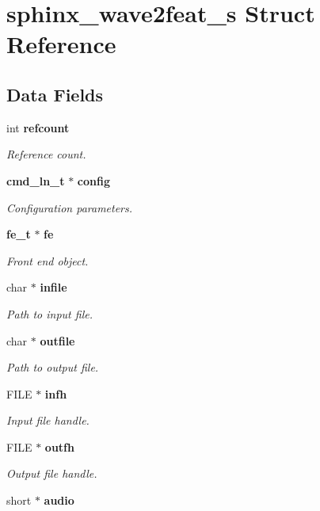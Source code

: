 \section{sphinx\+\_\+wave2feat\+\_\+s Struct Reference}
\label{structsphinx__wave2feat__s}
\subsection*{Data Fields}
\begin{DoxyCompactItemize}
\item 
int \textbf{ refcount}
\begin{DoxyCompactList}\small\item\em Reference count. \end{DoxyCompactList}\item 
\textbf{ cmd\+\_\+ln\+\_\+t} $\ast$ \textbf{ config}
\begin{DoxyCompactList}\small\item\em Configuration parameters. \end{DoxyCompactList}\item 
\textbf{ fe\+\_\+t} $\ast$ \textbf{ fe}
\begin{DoxyCompactList}\small\item\em Front end object. \end{DoxyCompactList}\item 
char $\ast$ \textbf{ infile}
\begin{DoxyCompactList}\small\item\em Path to input file. \end{DoxyCompactList}\item 
char $\ast$ \textbf{ outfile}
\begin{DoxyCompactList}\small\item\em Path to output file. \end{DoxyCompactList}\item 
F\+I\+LE $\ast$ \textbf{ infh}
\begin{DoxyCompactList}\small\item\em Input file handle. \end{DoxyCompactList}\item 
F\+I\+LE $\ast$ \textbf{ outfh}
\begin{DoxyCompactList}\small\item\em Output file handle. \end{DoxyCompactList}\item 
short $\ast$ \textbf{ audio}

\end{DoxyCompactItemize}
